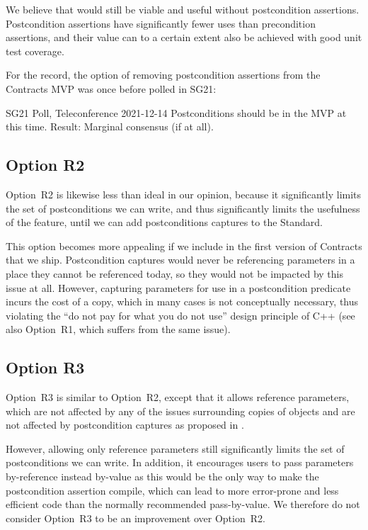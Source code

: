 We believe that \cite{P2900R10} would still be viable and useful without postcondition assertions. Postcondition assertions have significantly fewer uses than precondition assertions, and their value can to a certain extent also be achieved with good unit test coverage. 

For the record, the option of removing postcondition assertions from the Contracts MVP was once before polled in SG21:

\begin{wgpoll}{SG21 Poll, Teleconference 2021-12-14}
Postconditions should be in the MVP at this time.
Result: Marginal consensus (if at all).
\end{wgpoll}

\subsection*{Option R2}

Option~R2 is likewise less than ideal in our opinion, because it significantly limits the set of postconditions we can write, and thus significantly limits the usefulness of the feature, until we can add postconditions captures \cite{P3098R0} to the Standard.

This option becomes more appealing if we include \cite{P3098R0} in the first version of Contracts that we ship. Postcondition captures would never be referencing parameters in a place they cannot be referenced today, so they would not be impacted by this issue at all. However, capturing parameters for use in a postcondition predicate incurs the cost of a copy, which in many cases is not conceptually necessary, thus violating the ``do not pay for what you do not use'' design principle of C++ (see also \cite{D3484R1} Option~R1, which suffers from the same issue).


\subsection*{Option R3}

Option~R3 is similar to Option~R2, except that it allows reference parameters, which are not affected by any of the issues surrounding copies of objects and are not affected by postcondition captures as proposed in \cite{P3098R0}.

However, allowing only reference parameters still significantly limits the set of postconditions we can write. In addition, it encourages users to pass parameters by-reference instead by-value as this would be the only way to make the postcondition assertion compile, which can lead to more error-prone and less efficient code than the normally recommended pass-by-value. We therefore do not consider Option~R3 to be an improvement over Option~R2.

